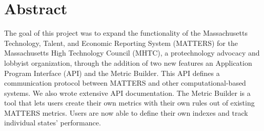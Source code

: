 \chapter*{Abstract}
	
The goal of this project was to expand the functionality of the Massachusetts 
Technology, Talent, and Economic Reporting System (MATTERS) for the 
Massachusetts High Technology Council (MHTC), a protechnology advocacy and 
lobbyist organization, through the addition of two new features an Application Program Interface
(API) and the Metric Builder. This API defines a communication protocol between MATTERS 
and other computational-based systems. We also wrote extensive API 
documentation. The Metric Builder is a tool that lets users create their own metrics with
their own rules out of existing MATTERS metrics. Users are now able to define their
own indexes and track individual states' performance.
